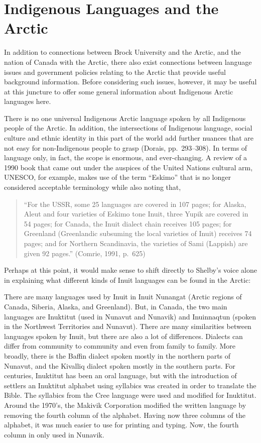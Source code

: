 \documentclass[a4paper,
fontsize=11pt,
oneside,
numbers=noperiodatend,
parskip=half-,
bibliography=totoc,
final
]{scrartcl}
\begin{document}
\hypertarget{indigenous-languages-and-the-arctic}{%
\section{Indigenous Languages and the
Arctic}\label{indigenous-languages-and-the-arctic}}

In addition to connections between Brock University and the Arctic, and
the nation of Canada with the Arctic, there also exist connections
between language issues and government policies relating to the Arctic
that provide useful background information. Before considering such
issues, however, it may be useful at this juncture to offer some general
information about Indigenous Arctic languages here.

There is no one universal Indigenous Arctic language spoken by all
Indigenous people of the Arctic. In addition, the intersections of
Indigenous language, social culture and ethnic identity in this part of
the world add further nuances that are not easy for non-Indigenous
people to grasp (Dorais, pp.~293--308). In terms of language only, in
fact, the scope is enormous, and ever-changing. A review of a 1990 book
that came out under the auspices of the United Nations cultural arm,
UNESCO, for example, makes use of the term \enquote{Eskimo} that is no
longer considered acceptable terminology while also noting that,

\begin{quote}
\enquote{For the USSR, some 25 languages are covered in 107 pages; for
Alaska, Aleut and four varieties of Eskimo tone Inuit, three Yupik are
covered in 54 pages; for Canada, the Inuit dialect chain receives 105
pages; for Greenland (Greenlandic subsuming the local varieties of
Inuit) receives 74 pages; and for Northern Scandinavia, the varieties of
Sami (Lappish) are given 92 pages.} (Comrie, 1991, p.~625)
\end{quote}

Perhaps at this point, it would make sense to shift directly to Shelby's
voice alone in explaining what different kinds of Inuit languages can be
found in the Arctic:

There are many languages used by Inuit in Inuit Nunangat (Arctic regions
of Canada, Siberia, Alaska, and Greenland). But, in Canada, the two main
languages are Inuktitut (used in Nunavut and Nunavik) and Inuinnaqtun
(spoken in the Northwest Territories and Nunavut). There are many
similarities between languages spoken by Inuit, but there are also a lot
of differences. Dialects can differ from community to community and even
from family to family. More broadly, there is the Baffin dialect spoken
mostly in the northern parts of Nunavut, and the Kivalliq dialect spoken
mostly in the southern parts. For centuries, Inuktitut has been an oral
language, but with the introduction of settlers an Inuktitut alphabet
using syllabics was created in order to translate the Bible. The
syllabics from the Cree language were used and modified for Inuktitut.
Around the 1970's, the Makivik Corporation modified the written language
by removing the fourth column of the alphabet. Having now three columns
of the alphabet, it was much easier to use for printing and typing. Now,
the fourth column in only used in Nunavik.
\end{document}
